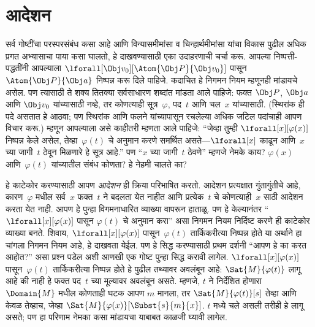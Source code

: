 \section{आदेशन}\label{fol:int:sub:sec}

सर्व गोष्टींचा परस्परसंबंध कसा आहे आणि विन्यासमीमांसा व
चिन्हार्थमीमांसा यांचा विकास पुढील अधिक प्रगत अभ्यासाचा पाया कसा घालतो,
हे दाखवण्यासाठी एका उदाहरणाची चर्चा करू. आपल्या निष्पत्ती-पद्धतींनी
आपल्याला $\lforall[\Obj v_0][\Atom{\Obj P}{\Obj v_0}]$ पासून
$\Atom{\Obj P}{\Obj a}$ निष्पन्न करू दिले पाहिजे. कदाचित हे निगमन नियम
म्हणूनही मांडायचे असेल. पण त्यासाठी ते शक्य तितक्या सर्वसाधारण शब्दांत
मांडता आले पाहिजे: फक्त $\Obj P$, $\Obj a$ आणि $\Obj v_0$ यांच्यासाठी
नव्हे, तर कोणत्याही सूत्र~$\varphi$, पद~$t$ आणि चल~$x$
यांच्यासाठी. (स्थिरांक ही पदे असतात हे आठवा; पण स्थिरांक आणि
फलने यांच्यापासून रचलेल्या अधिक जटिल पदांचाही आपण विचार करू.)
म्हणून आपल्याला असे काहीतरी म्हणता आले पाहिजे: ``जेव्हा तुम्ही
$\lforall[x][\varphi(x)]$ निष्पन्न केले असेल, तेव्हा~$\varphi(t)$ चे अनुमान
करणे समर्थित असते---$\lforall[x]$ काढून आणि~$x$ च्या जागी~$t$ ठेवून
मिळणारे हे सूत्र आहे.'' पण ``$x$ च्या जागी~$t$ ठेवणे'' म्हणजे नेमके
काय? $\varphi(x)$ आणि~$\varphi(t)$ यांच्यातील संबंध कोणता? हे नेहमी चालते का?


हे काटेकोर करण्यासाठी आपण \emph{आदेशन} ही क्रिया परिभाषित करतो.
आदेशन प्रत्यक्षात गुंतागुंतीचे आहे, कारण~$\varphi$ मधील सर्व~$x$ फक्त~$t$ ने
बदलता येत नाहीत आणि प्रत्येक~$t$ चे कोणत्याही~$x$ साठी आदेशन करता येत
नाही. आपण हे पुन्हा विगमनाधारित व्याख्या वापरून हाताळू. पण हे
केल्यानंतर ``$\lforall[x][\varphi(x)]$ पासून $\varphi(t)$ चे अनुमान करा'' असा
निगमन नियम निर्दिष्ट करणे ही काटेकोर व्याख्या बनते. शिवाय,
$\lforall[x][\varphi(x)]$ पासून~$\varphi(t)$ तार्किकरीत्या निष्पन्न होते या अर्थाने
हा चांगला निगमन नियम आहे, हे दाखवता येईल. पण हे सिद्ध करण्यासाठी प्रथम
दर्शनी ``आपण हे का करत आहोत?'' असा प्रश्न पडेल अशी आणखी एक गोष्ट पुन्हा
सिद्ध करावी लागेल. $\lforall[x][\varphi(x)]$ पासून~$\varphi(t)$ तार्किकरीत्या
निष्पन्न होते हे पुढील तथ्यावर अवलंबून आहे: $\Sat{M}{\varphi(t)}$ लागू आहे
की नाही हे फक्त पद~$t$ च्या मूल्यावर अवलंबून असते. म्हणजे, $t$ ने
निर्देशित होणारा~$\Domain{M}$ मधील कोणताही घटक आपण $m$ मानला,
तर $\Sat{M}{\varphi(t)}[s]$ तेव्हा आणि केवळ तेव्हाच, जेव्हा
$\Sat{M}{\varphi(x)}[\Subst{s}{m}{x}]$. $t$ मध्ये चले असली तरीही
हे लागू असते; पण हा परिणाम नेमका कसा मांडायचा याबाबत काळजी घ्यावी
लागेल.












